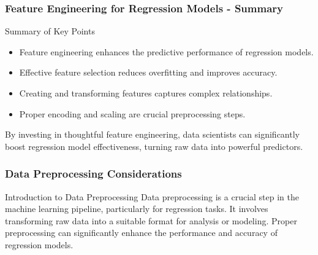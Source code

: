 \documentclass[aspectratio=169]{beamer}
\begin{document}
\begin{frame}[fragile]
    \frametitle{Feature Engineering for Regression Models - Summary}
    \begin{block}{Summary of Key Points}
        \begin{itemize}
            \item Feature engineering enhances the predictive performance of regression models.
            \item Effective feature selection reduces overfitting and improves accuracy.
            \item Creating and transforming features captures complex relationships.
            \item Proper encoding and scaling are crucial preprocessing steps.
        \end{itemize}
    \end{block}
    By investing in thoughtful feature engineering, data scientists can significantly boost regression model effectiveness, turning raw data into powerful predictors.
\end{frame}

\begin{frame}[fragile]
    \frametitle{Data Preprocessing Considerations}
    \begin{block}{Introduction to Data Preprocessing}
        Data preprocessing is a crucial step in the machine learning pipeline, particularly for regression tasks. It involves transforming raw data into a suitable format for analysis or modeling. Proper preprocessing can significantly enhance the performance and accuracy of regression models.
    \end{block}
\end{frame}
\end{document}
